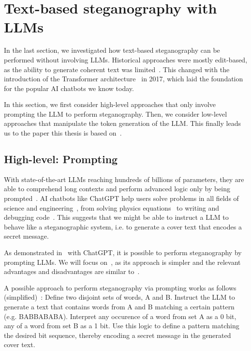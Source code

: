 \section{Text-based steganography with \glspl{LLM}}
\label{sec:textBasedSteganographyWithLLMs}
In the last section, we investigated how text-based steganography can be performed without involving \glspl{LLM}. Historical approaches were mostly edit-based, as the ability to generate coherent text was limited~\cite{zieglerNeuralLinguisticSteganography2019}. This changed with the introduction of the Transformer architecture~\cite{vaswaniAttentionAllYou2023} in 2017, which laid the foundation for the popular \gls{AI} chatbots we know today.

In this section, we first consider high-level approaches that only involve prompting the \gls{LLM} to perform steganography. Then, we consider low-level approaches that manipulate the token generation of the \gls{LLM}. This finally leads us to the paper this thesis is based on~\cite{zieglerNeuralLinguisticSteganography2019}.

\subsection{High-level: Prompting}
\label{sec:highLevelPrompting}
With state-of-the-art \glspl{LLM} reaching hundreds of billions of parameters, they are able to comprehend long contexts and perform advanced logic only by being prompted~\cite{hossainLLMProSAnalyzingLarge2025}. \gls{AI} chatbots like ChatGPT help users solve problems in all fields of science and engineering~\cite{schmidgallAgentLaboratoryUsing2025}, from solving physics equations~\cite{songLLMFeynmanLeveragingLarge2025,panQuantumManybodyPhysics2025} to writing and debugging code~\cite{leeGitHubRecentBugs2024,leeUnifiedDebuggingApproach2024,tianDebugBenchEvaluatingDebugging2024,shiCodeCorrectnessClosing2024}. This suggests that we might be able to instruct a \gls{LLM} to behave like a steganographic system, i.e. to generate a cover text that encodes a secret message.

As demonstrated in~\cite{steinebachNaturalLanguageSteganography2024,wuPromptingSteganographyNew2024} with ChatGPT, it is possible to perform steganography by prompting \glspl{LLM}. We will focus on~\cite{steinebachNaturalLanguageSteganography2024}, as its approach is simpler and the relevant advantages and disadvantages are similar to~\cite{wuPromptingSteganographyNew2024}.

A possible approach to perform steganography via prompting works as follows (simplified)~\cite{steinebachNaturalLanguageSteganography2024}: Define two disjoint sets of words, A and B. Instruct the LLM to generate a text that contains words from A and B matching a certain pattern (e.g. BABBABABA). Interpret any occurence of a word from set A as a 0 bit, any of a word from set B as a 1 bit. Use this logic to define a pattern matching the desired bit sequence, thereby encoding a secret message in the generated cover text.

